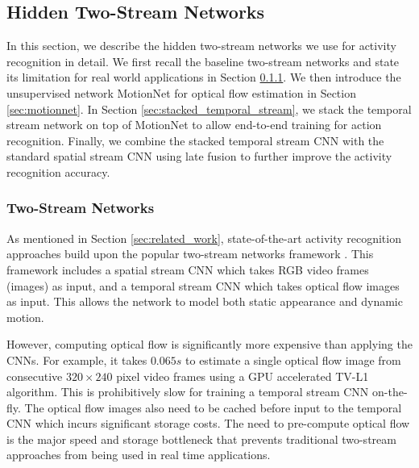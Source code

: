 \documentclass[sigconf]{acmart}
\begin{document}
	\subsection{Hidden Two-Stream Networks}
	\label{sec:hidden_two_stream_networks}
	In this section, we describe the hidden two-stream networks \cite{hidden_zhu_17} we use for activity recognition in detail. We first recall the baseline two-stream networks \cite{twostream2014} and state its limitation for real world applications in Section \ref{sec:two_stream_networks}. We then introduce the unsupervised network MotionNet for optical flow estimation in Section \ref{sec:motionnet}. In Section \ref{sec:stacked_temporal_stream}, we stack the temporal stream network on top of MotionNet to allow end-to-end training for action recognition. Finally, we combine the stacked temporal stream CNN with the standard spatial stream CNN using late fusion to further improve the activity recognition accuracy.
	
	\subsubsection{\textbf{Two-Stream Networks}}
	\label{sec:two_stream_networks}
	
	As mentioned in Section \ref{sec:related_work}, state-of-the-art activity recognition approaches \cite{wanggoodpractice2015,convTwoStream2016,depth2action,TSN2016,res_two_stream_nips16,diba_tle_2016} build upon the popular two-stream networks framework \cite{twostream2014}. This framework includes a spatial stream CNN which takes RGB video frames (images) as input, and a temporal stream CNN which takes optical flow images as input. This allows the network to model both static appearance and dynamic motion.
	
	However, computing optical flow is significantly more expensive than applying the CNNs. For example, it takes $0.065s$ to estimate a single optical flow image from consecutive $320\times240$ pixel video frames using a GPU accelerated TV-L1 \cite{tvl1realTime} algorithm. This is prohibitively slow for training a temporal stream CNN on-the-fly. The optical flow images also need to be cached before input to the temporal CNN which incurs significant storage costs. The need to pre-compute optical flow is the major speed and storage bottleneck that prevents traditional two-stream approaches from being used in real time applications.
	
\end{document}

